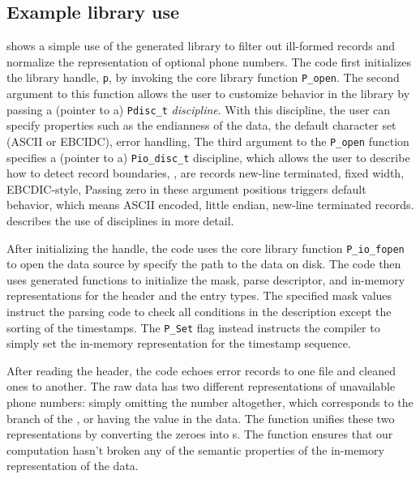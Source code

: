 \subsection{Example library use}
\label{sec:example:library-use}
 shows a simple use of 
the generated \dibbler{} library to filter out ill-formed records and normalize the representation of optional phone numbers. 
The code first initializes the \pads{} library handle, \texttt{p}, by invoking the core library function \texttt{P\_open}.  The second argument to this function allows the user to customize behavior in the \pads{} library by passing a (pointer to a) \texttt{Pdisc\_t} \textit{discipline}. With this discipline, the user can specify properties such as the endianness of the data, the default character set (ASCII or EBCIDC), error handling, \etc{}  The third argument to the \texttt{P\_open} function specifies a (pointer to a) \texttt{Pio\_disc\_t} discipline, which allows the user to describe how to detect record boundaries, \ie{}, are records new-line terminated, fixed width, EBCDIC-style, \etc{} 
Passing zero in these argument positions triggers default behavior, which 
means ASCII encoded, little endian, new-line terminated records.
 describes the use of disciplines in more detail. 

After initializing the \pads{} handle, the code uses the core library function \texttt{P\_io\_fopen} to open the data source by specify the path to the data on disk.  The code then uses generated functions to initialize the mask, parse descriptor, and in-memory representations for the header and the entry types.
The specified mask values instruct the parsing code to check all conditions in the \dibbler{} description except the sorting of the timestamps.  The \texttt{P\_Set} flag instead instructs the compiler to simply set the in-memory representation for the timestamp sequence.

After reading the header, 
the code echoes error records to one file and cleaned ones to another.
The raw data has two different representations of unavailable phone numbers:
simply omitting the number altogether, which corresponds to the 
branch of the , or having the value  in the data.  
The function  unifies these two representations 
by converting the zeroes into s.  The function 
ensures that our computation hasn't broken any of the semantic properties
of the in-memory representation of the data.

